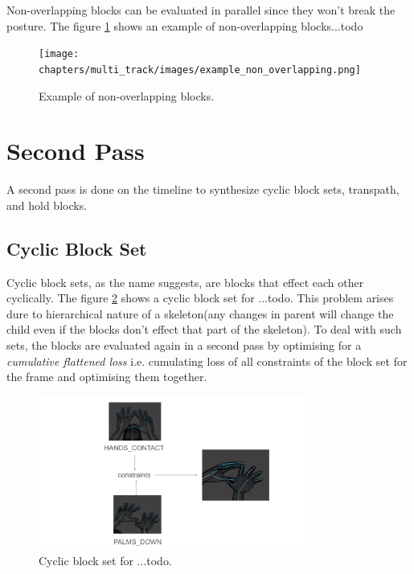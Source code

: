 \documentclass[../../main.tex]{subfiles}
\begin{document}
Non-overlapping blocks can be evaluated in parallel since they won't break the posture. The figure \ref{fig:example_non_overlapping} shows an example of non-overlapping blocks...todo

\begin{figure}[h]
    \centering
    \texttt{[image: chapters/multi\_track/images/example\_non\_overlapping.png]}
    \caption{Example of non-overlapping blocks.}
    \label{fig:example_non_overlapping}
\end{figure}

\section{Second Pass}
\label{ch:multi_track:second_pass}

A second pass is done on the timeline to synthesize cyclic block sets, transpath, and hold blocks.

\subsection{Cyclic Block Set}
\label{ch:multi_track:second_pass:cyclic_blocks}

Cyclic block sets, as the name suggests, are blocks that effect each other cyclically. The figure \ref{fig:cyclic_blocks} shows a cyclic block set for ...todo. This problem arises dure to hierarchical nature of a skeleton(any changes in parent will change the child even if the blocks don't effect that part of the skeleton). To deal with such sets, the blocks are evaluated again in a second pass by optimising for a \emph{cumulative flattened loss} i.e. cumulating loss of all constraints of the block set for the frame and optimising them together.

\begin{figure}[h]
    \centering
    \includegraphics[width=0.8\textwidth]{chapters/multi_track/images/cyclic_blocks.png}
    \caption{Cyclic block set for ...todo.}
    \label{fig:cyclic_blocks}
\end{figure}
\end{document}

